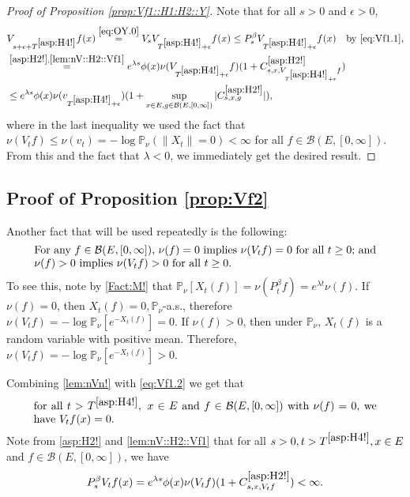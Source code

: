 \documentclass[12pt,a4paper]{amsart}
\numberwithin{equation}{section}
\theoremstyle{plain}
\theoremstyle{definition}
\theoremstyle{remark}
\begin{document}
\begin{proof}[{Proof of Proposition \ref{prop:Vf1::H1:H2::Y}}]
	Note that for all $s>0$ and $\epsilon>0$,
\begin{align}
	& V_{s+\epsilon +T^{\eqref{asp:H4!}}} f (x)
	\overset{\eqref{eq:OY.0}}= V_s V_{T^{\eqref{asp:H4!}}+\epsilon} f(x)
	\leq P_s^\beta V_{T^{\eqref{asp:H4!}} + \epsilon} f(x)\quad\text{by \eqref{eq:Vf1.1}},
 	\\ \label{eq:Vf1.2} & \overset{\eqref{asp:H2!},\eqref{lem:nV::H2::Vf1}}= e^{\lambda s}\phi(x) \nu( V_{T^{\eqref{asp:H4!}} +\epsilon} f)  (1+ C^{\eqref{asp:H2!}}_{s,x,V_{T^{\eqref{asp:H4!}} + \epsilon} f})
	\\&\leq e^{\lambda s}\phi(x) \nu(v_{T^{\eqref{asp:H4!}} +\epsilon})  (1+ \sup_{x\in E, g\in \mathcal B(E,[0,\infty])}|C^{\eqref{asp:H2!}}_{s,x,g}|),
\end{align}
	where
	in the last inequality we used the fact that $\nu(V_t f) \leq \nu(v_t)   = - \log \mathbb P_\nu (\|X_t\| = 0)  < \infty$  for all  $f\in \mathcal B(E,[0,\infty])$.
	From this and the fact that $\lambda < 0$, we immediately get the desired result.
\end{proof}

\subsection{Proof of Proposition \ref{prop:Vf2}} \label{sec:Vf2}
	Another fact that will be used repeatedly is the following:
\begin{equation}
\begin{minipage}{0.9\textwidth}
	For any $f\in \mathcal B(E,[0,\infty])$, $\nu(f) = 0$ implies $\nu(V_tf)=0$ for all $t\ge 0$; and $\nu(f)>0$ implies $\nu(V_tf)>0$ for all $t\ge 0$.
\end{minipage}\label{lem:nVn!}
\end{equation}
	To see this, note by \eqref{Fact:M!} that $ \mathbb P_\nu[X_t(f)] = \nu (P_t^\beta f) = e^{\lambda t}\nu (f). $
	If $\nu(f) = 0$, then $X_t(f)=0, \mathbb P_\nu$-a.s., therefore $\nu(V_t f) = - \log \mathbb P_\nu[e^{-X_t(f)}] =0. $
	If $\nu(f) > 0$, then under $\mathbb P_\nu$, $X_t(f)$ is a random variable with positive mean.
	Therefore, $ \nu(V_tf) = - \log \mathbb P_\nu[e^{-X_t(f)}] >0$.

	Combining \eqref{lem:nVn!} with \eqref{eq:Vf1.2} we get that
\begin{equation}
\begin{minipage}{0.9\textwidth}
	for all $t>T^{\eqref{asp:H4!}},~x\in E$ and $f \in \mathcal B(E,[0,\infty])$ with $\nu(f) = 0$, we have $V_t f(x ) = 0$.
\end{minipage} \label{lem:nullVf}
\end{equation}
Note  from \eqref{asp:H2!} and \eqref{lem:nV::H2::Vf1} that for all $s>0, t> T^{\eqref{asp:H4!}}, x\in E$ and $f\in \mathcal B(E,[0,\infty])$, we have
\begin{equation}
	P_s^\beta V_tf(x)  =e^{\lambda s} \phi(x)\nu(V_tf) (1+C^{\eqref{asp:H2!}}_{s,x,V_tf}) <\infty.
\label{lem:PV}
\end{equation}
\end{document}

